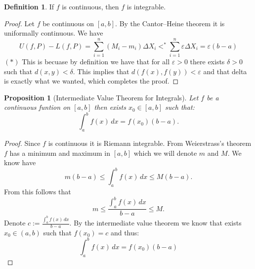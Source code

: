 \documentclass[11pt,a4paper]{article}
\theoremstyle{definition}
\newtheorem{definition}{Definition}[section]
\theoremstyle{plain}
\newtheorem{proposition}[theorem]{Proposition}
\begin{document}
  \begin{definition}
    If $f$ is continuous, then $f$ is integrable.
  \end{definition}
  \begin{proof}
    Let $f$ be continuous on $[a,b]$.
    By the Cantor--Heine theorem it is uniformally continuous.
    We have
    \[
      U(f,P) - L(f,P) =
      \sum_{i=1}^{n}(M_i-m_i)\Delta X_i <^{*}
      \sum_{i=1}^n\varepsilon\Delta X_i = \varepsilon(b-a)
    \]
    $(*)$ This is becuase by definition we have that for all $\varepsilon > 0$
    there exists $\delta > 0$ such that $d(x,y) < \delta$. 
    This implies that $d(f(x),f(y)) < \varepsilon$
    and that delta is exactly what we wanted, which completes the proof.
  \end{proof}

  \begin{proposition}[Intermediate Value Theorem for Integrals]
    Let $f$ be a continuous funtion on $[a,b]$ then exists $x_0 \in [a,b]$
    such that: 
    \[
      \int_a^b f(x)\,dx = f(x_0)(b - a).
    \]
  \end{proposition}
  \begin{proof}
    Since $f$ is continuous it is Riemann integrable. 
    From Weierstrass's theorem $f$ has a minimum and maximum in $[a,b]$ 
    which we will denote $m$ and $M$.
    We know have
    \[
      m (b - a) \le \int_a^b f(x)\,dx \le M (b - a).
    \]
    From this follows that
    \[
      m \le \frac{\int_{a}^{b} f(x)\,dx}{b - a} \le M.
    \]
    Denote $c := \frac{\int_{a}^{b} f(x)\,dx}{b - a}$.
    By the intermediate value theorem we know that exists $x_0 \in (a,b)$
    such that $f(x_0) = c$ and thus:
    \[
      \int_{a}^{b} f(x)\,dx = f(x_0)(b - a)
    \]
  \end{proof}

  \newpage
\end{document}
